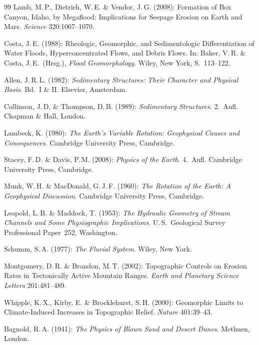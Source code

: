 ﻿\documentclass[12pt,a4paper]{report}
\begin{document}
\begin{thebibliography}{99}
Lamb, M.\,P., Dietrich, W.\,E. \& Vendor, J.\,G. (2008): Formation of Box Canyon, Idaho, by Megaflood: Implications for Seepage Erosion on Earth and Mars. \textit{Science} 320:1067--1070.

Costa, J.\,E. (1988): Rheologic, Geomorphic, and Sedimentologic Differentiation of Water Floods, Hyperconcentrated Flows, and Debris Flows. In: Baker, V.\,R. \& Costa, J.\,E.\ (Hrsg.), \textit{Flood Geomorphology}. Wiley, New York, S.\ 113--122.

Allen, J.\,R.\,L. (1982): \textit{Sedimentary Structures: Their Character and Physical Basis}. Bd.\ I \& II. Elsevier, Amsterdam.

Collinson, J.\,D. \& Thompson, D.\,B. (1989): \textit{Sedimentary Structures}. 2.\ Aufl. Chapman \& Hall, London.


Lambeck, K. (1980): \textit{The Earth's Variable Rotation: Geophysical Causes and Consequences}. Cambridge University Press, Cambridge.

Stacey, F.\,D. \& Davis, P.\,M. (2008): \textit{Physics of the Earth}. 4.\ Aufl. Cambridge University Press, Cambridge.

Munk, W.\,H. \& MacDonald, G.\,J.\,F. (1960): \textit{The Rotation of the Earth: A Geophysical Discussion}. Cambridge University Press, Cambridge.


Leopold, L.\,B. \& Maddock, T. (1953): \textit{The Hydraulic Geometry of Stream Channels and Some Physiographic Implications}. U.\,S.\ Geological Survey Professional Paper~252, Washington.

Schumm, S.\,A. (1977): \textit{The Fluvial System}. Wiley, New York.

Montgomery, D.\,R. \& Brandon, M.\,T. (2002): Topographic Controls on Erosion Rates in Tectonically Active Mountain Ranges. \textit{Earth and Planetary Science Letters} 201:481--489.

Whipple, K.\,X., Kirby, E. \& Brocklehurst, S.\,H. (2000): Geomorphic Limits to Climate-Induced Increases in Topographic Relief. \textit{Nature} 401:39--43.

Bagnold, R.\,A. (1941): \textit{The Physics of Blown Sand and Desert Dunes}. Methuen, London.


\end{thebibliography}
\end{document}
